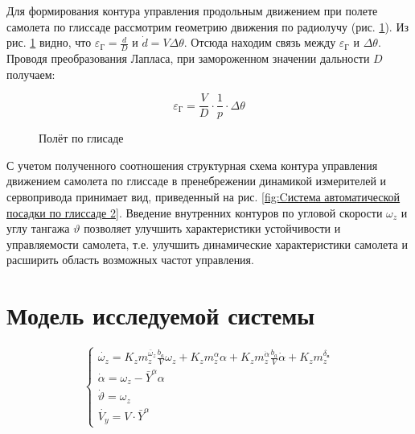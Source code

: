 Для формирования контура управления продольным движением при полете самолета по глиссаде рассмотрим геометрию движения по радиолучу (рис. \ref{fig:Полёт по глисаде 2}). Из рис. \ref{fig:Полёт по глисаде 2} видно, что $\varepsilon_\text{Г} = \frac{d}{D} $ и $\dot{d} = V\Delta \theta$. Отсюда находим связь между $\varepsilon_\text{Г}$ и $\Delta \theta$. Проводя преобразования Лапласа, при замороженном значении дальности $D$ получаем:

$$ \varepsilon_\text{Г} = \frac{V}{D} \cdot \frac{1}{p} \cdot \Delta \theta  $$

\begin{figure}[H]
    \caption{Полёт по глисаде}
    \label{fig:Полёт по глисаде 2}
\end{figure}

С учетом полученного соотношения структурная схема контура управления движением самолета по глиссаде в пренебрежении динамикой измерителей и сервопривода принимает вид, приведенный на рис. \ref{fig:Cистема автоматической посадки по глиссаде 2}. Введение внутренних контуров по угловой скорости $\omega_z$ и углу тангажа $\vartheta$  позволяет улучшить характеристики устойчивости и управляемости самолета, т.е. улучшить динамические характеристики самолета и расширить область возможных частот управления.

\section{Модель исследуемой системы}
\label{eq: СДУ}
\begin{equation}
    \begin{cases}
    \dot{\omega_z} = K_{z}m_z^{\bar{\omega}_z}\frac{b_a}{V} \omega_z + K_z m_z^{\alpha} \alpha + K_z m_z^{\dot{\alpha}} \frac{b_a}{V} \dot{\alpha} + K_z m_z^{\delta_\text{в}}\\
    \dot{\alpha} = \omega_z - \bar{Y}^\alpha \alpha \\ 
    \dot{\vartheta} = \omega_z \\ 
    \dot{V_y} = V \cdot \bar{Y}^\alpha
\end{cases}
\end{equation}

